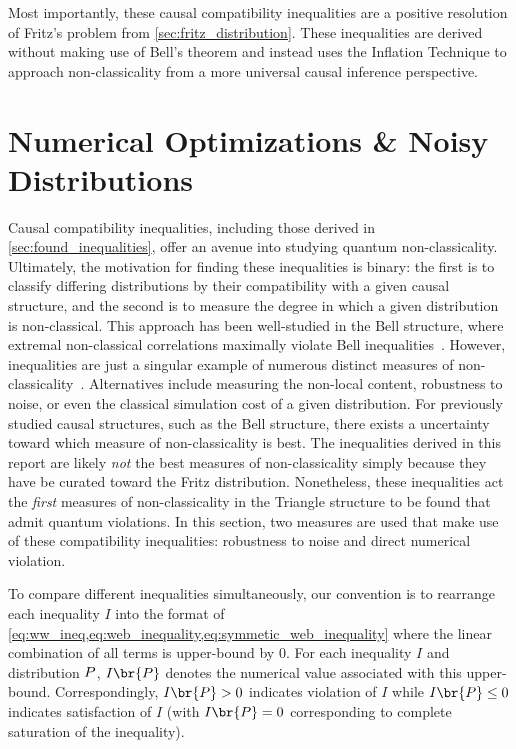 \documentclass[aps, 10pt, english, twoside, pra, nofootinbib, tightenlines, longbibliography, superscriptaddress]{revtex4-1}
\begin{document}
    Most importantly, these causal compatibility inequalities are a positive resolution of Fritz's problem from \cref{sec:fritz_distribution}. These inequalities are derived without making use of Bell's theorem and instead uses the Inflation Technique to approach non-classicality from a more universal causal inference perspective.

    \section{Numerical Optimizations \& Noisy Distributions}
    \label{sec:violations_noise}
    Causal compatibility inequalities, including those derived in \cref{sec:found_inequalities}, offer an avenue into studying quantum non-classicality. Ultimately, the motivation for finding these inequalities is binary: the first is to classify differing distributions by their compatibility with a given causal structure, and the second is to measure the degree in which a given distribution is non-classical. This approach has been well-studied in the Bell structure, where extremal non-classical correlations maximally violate Bell inequalities~\cite{PR_1995}. However, inequalities are just a singular example of numerous distinct measures of non-classicality~\cite[Section 5]{Vicente_2014}. Alternatives include measuring the non-local content, robustness to noise, or even the classical simulation cost of a given distribution. For previously studied causal structures, such as the Bell structure, there exists a uncertainty toward which measure of non-classicality is best. The inequalities derived in this report are likely \textit{not} the best measures of non-classicality simply because they have be curated toward the Fritz distribution. Nonetheless, these inequalities act the \textit{first} measures of non-classicality in the Triangle structure to be found that admit quantum violations. In this section, two measures are used that make use of these compatibility inequalities: robustness to noise and direct numerical violation.

    To compare different inequalities simultaneously, our convention is to rearrange each inequality $I$ into the format of \cref{eq:ww_ineq,eq:web_inequality,eq:symmetic_web_inequality} where the linear combination of all terms is upper-bound by $0$. For each inequality $I$ and distribution $\prob$, $I\br{\prob}$ denotes the numerical value associated with this upper-bound. Correspondingly, $I\br{\prob} > 0$ indicates violation of $I$ while $I\br{\prob} \leq 0$ indicates satisfaction of $I$ (with $I\br{\prob} = 0$ corresponding to complete saturation of the inequality).
\end{document}
